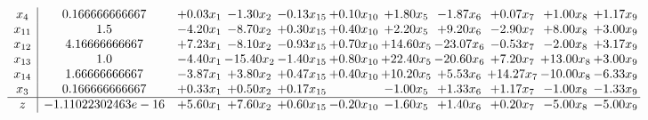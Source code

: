 \documentclass[9pt]{article}
\begin{document}
\[\begin{array}{c| c c@{\hskip 2pt} c@{\hskip 2pt} c@{\hskip 2pt} c@{\hskip 2pt} c@{\hskip 2pt} c@{\hskip 2pt} c@{\hskip 2pt} c@{\hskip 2pt} c@{\hskip 2pt} }
 x_{4}   &  0.166666666667 & +  0.03 x_{1} & -1.30 x_{2} & -0.13 x_{15} & +  0.10 x_{10} & +  1.80 x_{5} & -1.87 x_{6} & +  0.07 x_{7} & +  1.00 x_{8} & +  1.17 x_{9}\\
 x_{11}   &  1.5 & -4.20 x_{1} & -8.70 x_{2} & +  0.30 x_{15} & +  0.40 x_{10} & +  2.20 x_{5} & +  9.20 x_{6} & -2.90 x_{7} & +  8.00 x_{8} & +  3.00 x_{9}\\
 x_{12}   &  4.16666666667 & +  7.23 x_{1} & -8.10 x_{2} & -0.93 x_{15} & +  0.70 x_{10} & + 14.60 x_{5} & -23.07 x_{6} & -0.53 x_{7} & -2.00 x_{8} & +  3.17 x_{9}\\
 x_{13}   &  1.0 & -4.40 x_{1} & -15.40 x_{2} & -1.40 x_{15} & +  0.80 x_{10} & + 22.40 x_{5} & -20.60 x_{6} & +  7.20 x_{7} & + 13.00 x_{8} & +  3.00 x_{9}\\
 x_{14}   &  1.66666666667 & -3.87 x_{1} & +  3.80 x_{2} & +  0.47 x_{15} & +  0.40 x_{10} & + 10.20 x_{5} & +  5.53 x_{6} & + 14.27 x_{7} & -10.00 x_{8} & -6.33 x_{9}\\
 x_{3}   &  0.166666666667 & +  0.33 x_{1} & +  0.50 x_{2} & +  0.17 x_{15} &   & -1.00 x_{5} & +  1.33 x_{6} & +  1.17 x_{7} & -1.00 x_{8} & -1.33 x_{9}\\
\hline
z    &  -1.11022302463e-16 & +  5.60 x_{1} & +  7.60 x_{2} & +  0.60 x_{15} & -0.20 x_{10} & -1.60 x_{5} & +  1.40 x_{6} & +  0.20 x_{7} & -5.00 x_{8} & -5.00 x_{9}\\
\end{array}\]
\end{document}
